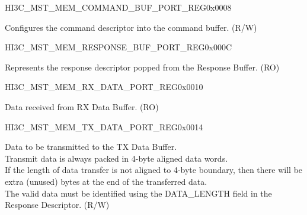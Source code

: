 \begin{register}{H}{I3C\_MST\_MEM\_COMMAND\_BUF\_PORT\_REG}{0x0008}\label{regdesc:I3CMSTMEMCOMMANDBUFPORTREG}
%
\regnewline%
\begin{regdesc}\begin{reglist}
\label{fielddesc:I3CMSTMEMCOMMAND}\item [I3C\_MST\_MEM\_COMMAND] Configures the command descriptor into the command buffer. (R/W)
\end{reglist}\end{regdesc}
\end{register}


\begin{register}{H}{I3C\_MST\_MEM\_RESPONSE\_BUF\_PORT\_REG}{0x000C}\label{regdesc:I3CMSTMEMRESPONSEBUFPORTREG}
%
\regnewline%
\begin{regdesc}\begin{reglist}
\label{fielddesc:I3CMSTMEMRESPONSE}\item [I3C\_MST\_MEM\_RESPONSE] Represents the response descriptor popped from the Response Buffer. (RO)
\end{reglist}\end{regdesc}
\end{register}


\begin{register}{H}{I3C\_MST\_MEM\_RX\_DATA\_PORT\_REG}{0x0010}\label{regdesc:I3CMSTMEMRXDATAPORTREG}
%
\regnewline%
\begin{regdesc}\begin{reglist}
\label{fielddesc:I3CMSTMEMRXDATAPORT}\item [I3C\_MST\_MEM\_RX\_DATA\_PORT] Data received from RX Data Buffer. (RO)
\end{reglist}\end{regdesc}
\end{register}


\begin{register}{H}{I3C\_MST\_MEM\_TX\_DATA\_PORT\_REG}{0x0014}\label{regdesc:I3CMSTMEMTXDATAPORTREG}
%
\regnewline%
\begin{regdesc}\begin{reglist}
\label{fielddesc:I3CMSTMEMTXDATAPORT}\item [I3C\_MST\_MEM\_TX\_DATA\_PORT] Data to be transmitted to the TX Data Buffer.\\
Transmit data is always packed in 4-byte aligned data words.\\
If the length of data transfer is not aligned to 4-byte boundary, then there will be extra (unused) bytes at the end of the transferred data.\\
The valid data must be identified using the DATA\_LENGTH field in the Response Descriptor. (R/W)
\end{reglist}\end{regdesc}
\end{register}


